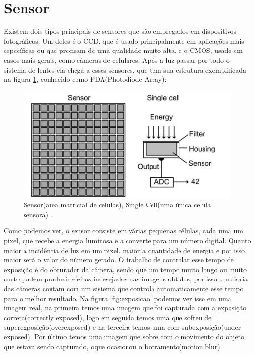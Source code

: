 \documentclass[
  brazilian,
]{book}
\begin{document}
\hypertarget{sensor}{%
\section{Sensor}\label{sensor}}

Existem dois tipos principais de sensores que são empregados em dispositivos fotográficos. Um deles é o CCD, que é usado principalmente em aplicações mais específicas ou que precisam de uma qualidade muito alta, e o CMOS, usado em casos mais gerais, como câmeras de celulares.
Após a luz passar por todo o sistema de lentes ela chega a esses sensores, que tem sua estrutura exemplificada na figura \ref{fig:sensor}, conhecido como PDA(Photodiode Array):



\begin{figure}

{\centering \includegraphics[width=0.55\linewidth]{imagens/02-formacao/sensor} 

}

\caption{Sensor(area matricial de celulas), Single Cell(uma única celula sensora) \autocite[p.17]{moeslund2012}.}\label{fig:sensor}
\end{figure}

Como podemos ver, o sensor consiste em várias pequenas células, cada uma um pixel, que recebe a energia luminosa e a converte para um número digital. Quanto maior a incidência de luz em um pixel, maior a quantidade de energia e por isso maior será o valor do número gerado. O trabalho de controlar esse tempo de exposição é do obturador da câmera, sendo que um tempo muito longo ou muito curto podem produzir efeitos indesejados nas imagens obtidas, por isso a maioria das câmeras contam com um sistema que controla automaticamente esse tempo para o melhor resultado. Na figura \ref{fig:exposicao} podemos ver isso em uma imagem real, na primeira temos uma imagem que foi capturada com a exposição correta(correctly exposed), logo em seguida temos uma que sofreu de superexposição(overexposed) e na terceira temos uma com subexposição(under exposed). Por último temos uma imagem que sobre com o movimento do objeto que estava sendo capturado, oque ocasionou o borramento(motion blur).
\end{document}
